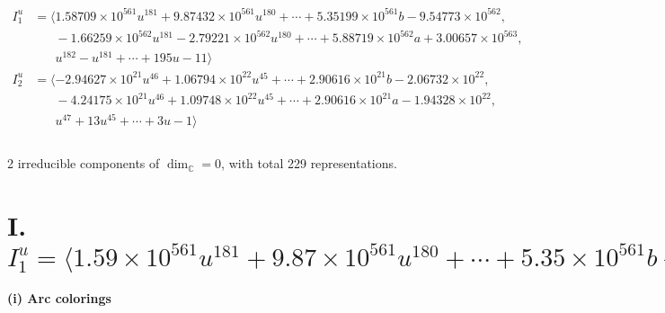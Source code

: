 \documentclass[1p]{elsarticle_modified}
\theoremstyle{definition}
\begin{document}
\begin{align*}
I^u_{1}&=\langle 
1.58709\times10^{561} u^{181}+9.87432\times10^{561} u^{180}+\cdots+5.35199\times10^{561} b-9.54773\times10^{562},\\
\phantom{I^u_{1}}&\phantom{= \langle  }-1.66259\times10^{562} u^{181}-2.79221\times10^{562} u^{180}+\cdots+5.88719\times10^{562} a+3.00657\times10^{563},\\
\phantom{I^u_{1}}&\phantom{= \langle  }u^{182}- u^{181}+\cdots+195 u-11\rangle \\
I^u_{2}&=\langle 
-2.94627\times10^{21} u^{46}+1.06794\times10^{22} u^{45}+\cdots+2.90616\times10^{21} b-2.06732\times10^{22},\\
\phantom{I^u_{2}}&\phantom{= \langle  }-4.24175\times10^{21} u^{46}+1.09748\times10^{22} u^{45}+\cdots+2.90616\times10^{21} a-1.94328\times10^{22},\\
\phantom{I^u_{2}}&\phantom{= \langle  }u^{47}+13 u^{45}+\cdots+3 u-1\rangle \\
\\
\end{align*}
\raggedright * 2 irreducible components of $\dim_{\mathbb{C}}=0$, with total 229 representations.\\
\newpage
\renewcommand{\arraystretch}{1}
\centering \section*{I. $I^u_{1}= \langle 1.59\times10^{561} u^{181}+9.87\times10^{561} u^{180}+\cdots+5.35\times10^{561} b-9.55\times10^{562},\;-1.66\times10^{562} u^{181}-2.79\times10^{562} u^{180}+\cdots+5.89\times10^{562} a+3.01\times10^{563},\;u^{182}- u^{181}+\cdots+195 u-11 \rangle$}
\flushleft \textbf{(i) Arc colorings}\\
\end{document}
